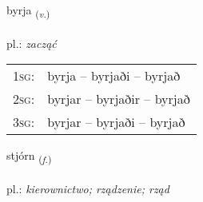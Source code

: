 \documentclass[frontgrid, backgrid]{flacards}\usepackage[]{graphicx}\usepackage[]{xcolor}
\begin{document}
\renewcommand{\flhead}{\vskip5pt \fboxsep=0pt {\small\bfseries\footnotesize Sagnorð | czasownik}}
\renewcommand{\fcfoot}{\vskip5pt \fboxsep=0pt \hspace{2pt}{\small\bfseries\footnotesize 1K}}

\renewcommand{\blhead}{\vskip5pt {\small\bfseries\footnotesize Sagnorð | czasownik }}
\renewcommand{\bcfoot}{\vskip5pt \hspace{2pt}{\small\bfseries\footnotesize 1K}}


{byrja \small{\textsubscript{(\textit{v.})}} \\[1ex] %
\textphonetic{[pɪrja]} \\
pl.: \emph{zacząć} \\  [2ex]
\renewcommand*{\arraystretch}{0.8}
\begin{tabular}{p{1cm}l}
\textsc{1sg}: & byrja -- byrjaði -- byrjað \\ 
\textsc{2sg}: & byrjar -- byrjaðir -- byrjað \\ 
\textsc{3sg}: & byrjar -- byrjaði -- byrjað \\ 
\end{tabular}
}

\renewcommand{\flhead}{\vskip5pt \fboxsep=0pt {\small\bfseries\footnotesize Nafnorð | rzeczownik}}
\renewcommand{\fcfoot}{\vskip5pt \fboxsep=0pt \hspace{2pt}{\small\bfseries\footnotesize 1K}}

\renewcommand{\blhead}{\vskip5pt {\small\bfseries\footnotesize Nafnorð | rzeczownik }}
\renewcommand{\bcfoot}{\vskip5pt \hspace{2pt}{\small\bfseries\footnotesize 1K}}


{stjórn \small{\textsubscript{(\textit{f.})}} \\[1ex] %
\textphonetic{[stjourtn̥]} \\
pl.: \emph{kierownictwo; rządzenie; rząd} \\  [2ex]
\renewcommand*{\arraystretch}{0.8}
}
\end{document}
